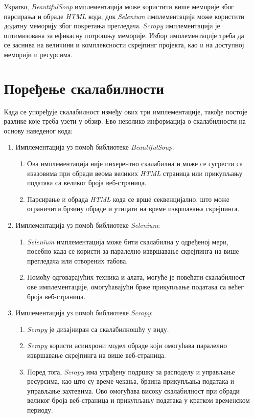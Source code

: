 \documentclass[12pt,oneside]{memoir}
\begin{document}
Укратко, \textit{BeautifulSoup} имплементација може користити више меморије због парсирања и обраде \textit{HTML} кода, док \textit{Selenium} имплементација може користити додатну меморију због покретања прегледача. \textit{Scrapy} имплементација је оптимизована за ефикасну потрошњу меморије. Избор имплементације треба да се заснива на величини и комплексности скрејпинг пројекта, као и на доступној меморији и ресурсима.

\section{Поређење скалабилности}
Када се упоређује скалабилност између ових три имплементације, такође постоје разлике које треба узети у обзир. Ево неколико информација о скалабилности на основу наведеног кода:

\begin{enumerate}
\item Имплементација уз помоћ библиотеке \textit{BeautifulSoup}:
\begin{enumerate}
\item Ова имплементација није инхерентно скалабилна и може се сусрести са изазовима при обради веома великих \textit{HTML} страница или прикупљању података са великог броја веб-страница.
\item Парсирање и обрада \textit{HTML} кода се врше секвенцијално, што може ограничити брзину обраде и утицати на време извршавања скрејпинга.
\end{enumerate}
\item Имплементација уз помоћ библиотеке \textit{Selenium}:
\begin{enumerate}
\item  \textit{Selenium} имплементација може бити скалабилна у одређеној мери, посебно када се користи за паралелно извршавање скрејпинга на више прегледача или отворених табова.
\item Помоћу одговарајућих техника и алата, могуће је повећати скалабилност ове имплементације, омогућавајући брже прикупљање података са већег броја веб-страница.
\end{enumerate}
\item Имплементација уз помоћ библиотеке \textit{Scrapy}:
\begin{enumerate}
\item \textit{Scrapy} је дизајниран са скалабилношћу у виду.
\item \textit{Scrapy} користи асинхрони модел обраде који омогућава паралелно извршавање скрејпинга на више веб-страница.
\item Поред тога, \textit{Scrapy} има уграђену подршку за расподелу и управљање ресурсима, као што су време чекања, брзина прикупљања података и управљање захтевима. Ово омогућава високу скалабилност при обради великог броја веб-страница и прикупљању података у кратком временском периоду.
\end{enumerate}
\end{enumerate}
\end{document}
